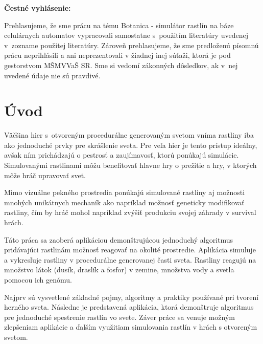 \documentclass[12pt]{article}
\def\nazovprace{Botanica - simulátor rastlín na báze celulárnych automatov}
\begin{document}
\setcounter{page}{3}


\thispagestyle{empty}

\null
\vfill

\noindent
\textbf{Čestné vyhlásenie:}

Prehlasujeme, že sme prácu na tému
\nazovprace \space
vypracovali samostatne s~použitím literatúry uvedenej v~zozname použitej literatúry.
Zároveň prehlasujeme, že sme predloženú písomnú prácu neprihlásili a ani neprezentovali
v žiadnej inej súťaži, ktorá je pod gestorstvom MŠMVVaŠ SR. Sme si vedomí zákonných dôsledkov,
ak v~nej uvedené údaje nie sú pravdivé.

\vspace{5cm}

\newpage


%
%

% 
% 
% 
% 


\thispagestyle{empty}
\tableofcontents

%
%

\section*{Úvod}

Väčšina hier s~otvoreným procedurálne generovaným svetom vníma rastliny iba ako
jednoduché prvky pre skrášlenie sveta. Pre veľa hier je tento prístup ideálny,
avšak ním prichádzajú o pestrosť a zaujímavosť, ktorú ponúkajú simulácie.
Simulovanými rastlinami môžu benefitovať hlavne hry o prežitie a hry, v ktorých
môže hráč upravovať svet.

Mimo vizuálne pekného prostredia ponúkajú simulované rastliny aj možnosti
mnohých unikátnych mechaník ako napríklad možnosť geneticky
modifikovať rastliny, čím by hráč mohol napríklad zvýšiť produkciu svojej záhrady
v survival hrách.

Táto práca sa zaoberá aplikáciou demonštrujúcou jednoduchý algoritmus
pridávajúci rastlinám možnosť reagovať na okolité prostredie. Aplikácia
simuluje a vykresľuje rastliny v procedurálne generovanej časti sveta.
Rastliny reagujú na množstvo látok (dusík, draslík a fosfor) v zemine,
množstva vody a svetla pomocou ich genómu.

Najprv sú vysvetlené základné pojmy, algoritmy a praktiky používané pri tvorení
herného sveta. Následne je predstavená aplikácia, ktorá demonštruje algoritmus
pre jednoduché spestrenie rastlín vo svete. Záver práce sa venuje možným
zlepšeniam aplikácie a ďalším využitiam simulovania rastlín v hrách
s otvoreným svetom.
\end{document}
